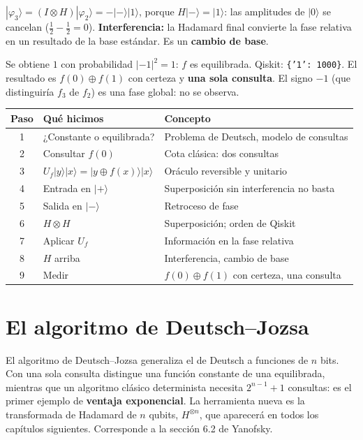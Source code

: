 \documentclass[11pt, a4paper, twoside, openright]{report}
\newcommand{\pasoguiado}[3]{%
\begin{tcolorbox}[colback=gray!6!white,colframe=gray!55!black,title={#1}]
#2
\tcblower
\small #3
\end{tcolorbox}}
\providecommand{\ket}[1]{|#1\rangle}
\begin{document}
\pasoguiado{Paso 8. Interferencia}
{$\ket{\varphi_3} = (I\otimes H)\ket{\varphi_2} = -\ket{-}\ket{1}$, porque $H\ket{-} = \ket{1}$: las amplitudes de $\ket{0}$ se cancelan ($\tfrac12 - \tfrac12 = 0$).}
{\textbf{Interferencia:} la Hadamard final convierte la fase relativa en un resultado de la base estándar. Es un \textbf{cambio de base}.}

\pasoguiado{Paso 9. Medir}
{Se obtiene $1$ con probabilidad $|-1|^2 = 1$: $f$ es equilibrada. Qiskit: \texttt{\{'1': 1000\}}.}
{El resultado es $f(0)\oplus f(1)$ con certeza y \textbf{una sola consulta}. El signo $-1$ (que distinguiría $f_3$ de $f_2$) es una fase global: no se observa.}

\begin{center}
\small\renewcommand{\arraystretch}{1.15}
\begin{tabular}{c|l|l}
\textbf{Paso} & \textbf{Qué hicimos} & \textbf{Concepto} \\ \hline
1 & ¿Constante o equilibrada? & Problema de Deutsch, modelo de consultas \\
2 & Consultar $f(0)$ & Cota clásica: dos consultas \\
3 & $U_f\ket{y}\ket{x} = \ket{y\oplus f(x)}\ket{x}$ & Oráculo reversible y unitario \\
4 & Entrada en $\ket{+}$ & Superposición sin interferencia no basta \\
5 & Salida en $\ket{-}$ & Retroceso de fase \\
6 & $H\otimes H$ & Superposición; orden de Qiskit \\
7 & Aplicar $U_f$ & Información en la fase relativa \\
8 & $H$ arriba & Interferencia, cambio de base \\
9 & Medir & $f(0)\oplus f(1)$ con certeza, una consulta
\end{tabular}
\end{center}

\chapter{El algoritmo de Deutsch--Jozsa}

\noindent El algoritmo de Deutsch--Jozsa \cite{deutsch1992, cleve1998} generaliza el de Deutsch a funciones de $n$ bits. Con una sola consulta distingue una función constante de una equilibrada, mientras que un algoritmo clásico determinista necesita $2^{n-1}+1$ consultas: es el primer ejemplo de \textbf{ventaja exponencial}. La herramienta nueva es la transformada de Hadamard de $n$ qubits, $H^{\otimes n}$, que aparecerá en todos los capítulos siguientes. Corresponde a la sección 6.2 de Yanofsky.
\end{document}
